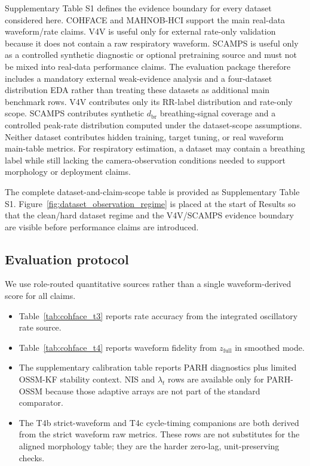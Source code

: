 \documentclass[fleqn,10pt]{wlscirep}
\begin{document}
Supplementary Table S1 defines the evidence boundary for every
dataset considered here. COHFACE and MAHNOB-HCI support
the main real-data waveform/rate claims. V4V is useful only for external
rate-only validation because it does not contain a raw respiratory waveform.
SCAMPS is useful only as a controlled synthetic diagnostic or optional
pretraining source and must not be mixed into real-data performance claims.
The evaluation package therefore includes a mandatory external weak-evidence
analysis and a four-dataset distribution EDA rather than treating these datasets
as additional main benchmark rows. V4V contributes only its RR-label
distribution and rate-only scope. SCAMPS contributes synthetic
$d_{\mathrm{br}}$ breathing-signal coverage and a controlled peak-rate
distribution computed under the dataset-scope assumptions. Neither dataset
contributes hidden training, target tuning, or real waveform main-table metrics.
For respiratory estimation, a dataset may contain a breathing label while still
lacking the camera-observation conditions needed to support morphology or
deployment claims.

The complete dataset-and-claim-scope table is provided as Supplementary Table S1.
Figure~\ref{fig:dataset_observation_regime} is placed at the start of Results so
that the clean/hard dataset regime and the V4V/SCAMPS evidence boundary are
visible before performance claims are introduced.

\subsection*{Evaluation protocol}
We use role-routed quantitative sources rather than a
single waveform-derived score for all claims.
\begin{itemize}[nosep]
\item Table~\ref{tab:cohface_t3} reports rate accuracy from the integrated
      oscillatory rate source.
\item Table~\ref{tab:cohface_t4} reports waveform fidelity from
      $z_{\mathrm{full}}$ in smoothed mode.
\item The supplementary calibration table reports PARH diagnostics plus
      limited OSSM-KF stability context. NIS and $\lambda_t$ rows are
      available only for PARH-OSSM because those adaptive arrays are not part of
      the standard comparator.
\item The T4b strict-waveform and T4c cycle-timing companions are both derived
      from the strict waveform raw metrics. These rows are not substitutes for
      the aligned morphology table; they are the harder zero-lag,
      unit-preserving checks.
\end{itemize}
\end{document}
